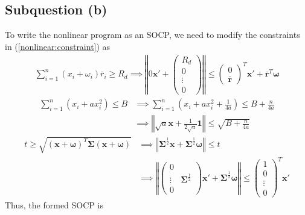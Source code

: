 \documentclass[12pt]{ftec2101}
\newcommand{\vect}[1]{\mathbf{#1}}
\begin{document}
\subsection{Subquestion (b)}
To write the nonlinear program as an SOCP, we need to modify the constraints in (\ref{nonlinear:constraint}) as
\begin{align}
    \sum_{i=1}^{n} (x_i + \omega_i)\bar{r}_i \geq R_d \implies \left \Vert 0 \vect{x'} + 
    \begin{pmatrix}
        R_d\\
        0\\
        \vdots\\
        0
    \end{pmatrix} \right \Vert \leq
    \begin{pmatrix}
        0\\
        \bar{\vect{r}}
    \end{pmatrix}^T \vect{x'} + \bar{\vect{r}}^T \boldsymbol{\omega}
\end{align}
\begin{align}
    \sum_{i=1}^{n} (x_i + a x_i^2) \leq B &\implies \sum_{i=1}^{n} \left(x_i + a x_i^2+\frac{1}{4a}\right) \leq B+\frac{n}{4a} \\
    &\implies \left \Vert \sqrt{a} \vect{x} + \frac{1}{2\sqrt{a}} \vect{1}\right \Vert \leq \sqrt{B+\frac{n}{4a}}
\end{align}
\begin{align}
    t \geq \sqrt{(\vect{x}+\boldsymbol{\omega})^T \boldsymbol{\Sigma} (\vect{x}+\boldsymbol{\omega})} &\implies \left \Vert \boldsymbol{\Sigma}^{\frac{1}{2}} \vect{x} + \boldsymbol{\Sigma}^{\frac{1}{2}}\boldsymbol{\omega}\right \Vert \leq t \\
    &\implies \left \Vert
    \begin{pmatrix}
        0 & \\
        \vdots & \boldsymbol{\Sigma}^{\frac{1}{2}}\\
        0 & 
    \end{pmatrix} \vect{x'} + \boldsymbol{\Sigma}^{\frac{1}{2}} \boldsymbol{\omega} \right \Vert \leq
    \begin{pmatrix}
        1 \\
        0 \\
        \vdots \\
        0
    \end{pmatrix}^T \vect{x'}
\end{align}
Thus, the formed SOCP is 
\end{document}
